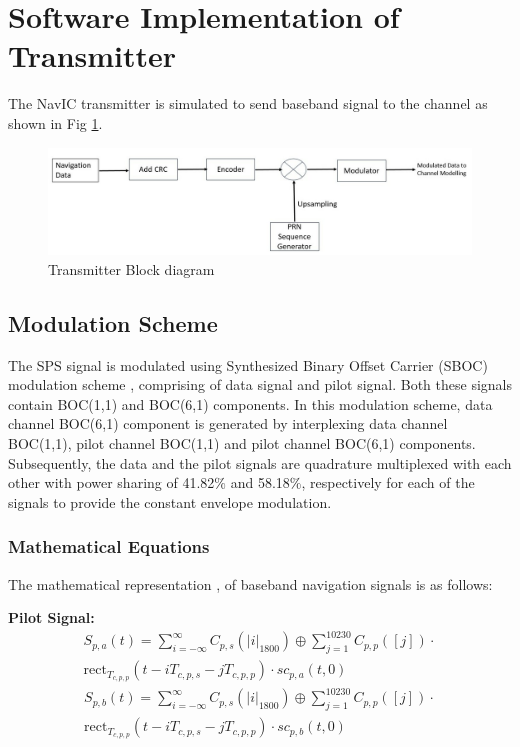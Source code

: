 \documentclass[conference]{IEEEtran}
\begin{document}
\section{Software Implementation of Transmitter}
The NavIC transmitter is simulated to send baseband signal to the channel as shown in Fig \ref{fig:trans_flow}.

\begin{figure}[ht]
    \centering
    \includegraphics[width=1\columnwidth]{figs/trans_flow.jpg}
    \centering
    \caption{Transmitter Block diagram}
    \label{fig:trans_flow}
    \end{figure}


\subsection{Modulation Scheme} \label{AA} 
The SPS signal is modulated using Synthesized Binary Offset Carrier (SBOC) modulation 
scheme \cite{b2}, comprising of data signal and pilot signal. Both these signals 
contain BOC(1,1) and BOC(6,1) components. In this modulation scheme, data channel BOC(6,1) 
component is generated by interplexing data channel BOC(1,1), pilot channel BOC(1,1) and pilot 
channel BOC(6,1) components. Subsequently, the data and the pilot signals are quadrature 
multiplexed with each other with power sharing of 41.82$\%$ and 58.18$\%$, respectively for each 
of the signals to provide the constant envelope modulation. 

\subsubsection{Mathematical Equations}
\noindent The mathematical representation \cite{b1},\cite{b2} of baseband navigation signals is as follows:

\noindent\textbf{Pilot Signal:}
\begin{multline}
S_{p,a}(t) = \sum_{i=-\infty}^{\infty} C_{p,s}(|i|_{1800}) \oplus \sum_{j=1}^{10230}C_{p,p}([j])\cdot \\
             \text{rect}_{T_{c,p,p}} \left( t - iT_{c,p,s} - jT_{c,p,p}\right) \cdot sc_{p,a}(t, 0)
\label{eq:sp_a}
\end{multline}
\begin{multline}
S_{p,b}(t) =    \sum_{i=-\infty}^{\infty} C_{p,s}(|i|_{1800}) \oplus \sum_{j=1}^{10230}C_{p,p}([j])\cdot \\
    \text{rect}_{T_{c,p,p}} \left( t - iT_{c,p,s} - jT_{c,p,p}\right) \cdot sc_{p,b}(t, 0)
\label{eq:sp_b}
\end{multline}
\end{document}
